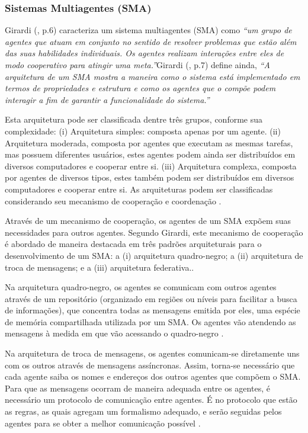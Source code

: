 \subsubsection{Sistemas Multiagentes (SMA)}

Girardi (\citeyear{girardi2004}, p.6) caracteriza um sistema multiagentes (SMA) como \textit{“um grupo de agentes que atuam em conjunto no sentido de resolver problemas que estão além das suas habilidades individuais. Os agentes realizam interações entre eles de modo cooperativo para atingir uma meta.”}Girardi (\citeyear{girardi2004}, p.7) define ainda, \textit{“A arquitetura  de um SMA mostra a maneira como o sistema está implementado em termos de propriedades e estrutura e como os agentes que o compõe podem interagir a fim de garantir a funcionalidade do sistema.”}

 Esta arquitetura pode ser classificada dentre três grupos, conforme sua complexidade: (i) Arquitetura simples: composta apenas por um agente. (ii) Arquitetura moderada, composta por agentes que executam as mesmas tarefas, mas possuem diferentes usuários, estes agentes podem ainda ser distribuídos em diversos computadores e cooperar entre si. (iii) Arquitetura complexa, composta por agentes de diversos tipos, estes também podem ser distribuídos em diversos computadores e cooperar entre si. As arquiteturas podem ser classificadas considerando seu mecanismo de cooperação e coordenação .

Através de um mecanismo de cooperação, os agentes de um SMA expõem suas necessidades para outros agentes. Segundo Girardi, este mecanismo de cooperação é abordado de maneira destacada em três padrões arquiteturais para o desenvolvimento de um SMA: a (i) arquitetura quadro-negro; a (ii) arquitetura de troca de mensagens; e a (iii) arquitetura federativa.\cite[p. 7]{girardi2004}. 

Na arquitetura quadro-negro, os agentes se comunicam com outros agentes através de um repositório (organizado em regiões ou níveis para facilitar a busca de informações), que concentra todas as mensagens emitida por eles, uma espécie de memória compartilhada utilizada por um SMA. Os agentes vão atendendo as mensagens à medida em que vão acessando o quadro-negro \cite[p. 7]{girardi2004}.

Na arquitetura de troca de mensagens, os agentes comunicam-se diretamente uns com os outros através de mensagens assíncronas. Assim, torna-se necessário que cada agente saiba os nomes e endereços dos outros agentes que compõem o SMA. Para que as mensagens ocorram de maneira adequada entre os agentes, é necessário um protocolo de comunicação entre agentes. É no protocolo que estão as regras, as quais agregam um formalismo adequado, e serão seguidas pelos agentes para se obter a melhor comunicação possível \cite[p. 8]{girardi2004}.

